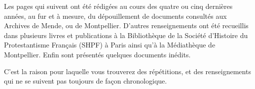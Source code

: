 \begin{tcolorbox}[
  colback=white,
  colframe=black,
  boxrule=0.7pt,
  arc=0pt,
  left=0.25cm,
  right=0.25cm,
  top=0.12cm,
  bottom=0.12cm,
  boxsep=0pt
]
\small
Les pages qui suivent ont été rédigées au cours des quatre ou cinq dernières années, au fur et à mesure, du dépouillement de documents consultés aux Archives de Mende, ou de Montpellier. D’autres renseignements ont été recueillis dans plusieurs livres et publications à la Bibliothèque de la Société d’Histoire du Protestantisme Français (SHPF) à Paris ainsi qu’à la Médiathèque de Montpellier. Enfin sont présentés quelques documents inédits.

C’est la raison pour laquelle vous trouverez des répétitions, et des renseignements qui ne se suivent pas toujours de façon chronologique.
\end{tcolorbox}

